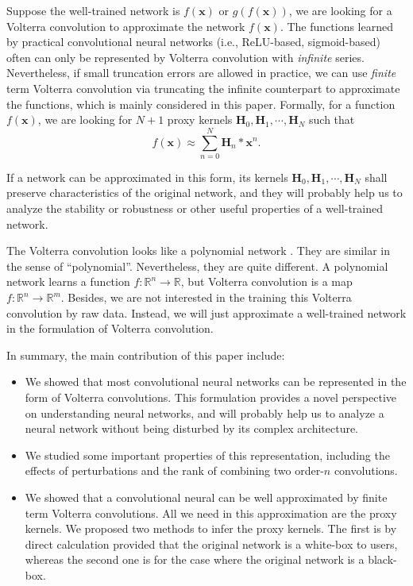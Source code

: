 \documentclass[twoside,11pt]{article}
\def\tvar#1{\mathbf{#1}} %
\begin{document}
Suppose the well-trained network is \(f(\tvar{x})\) or \(g(f(\tvar{x}))\), we are looking for a Volterra convolution to approximate the network \(f(\tvar{x})\).
The functions learned by practical convolutional neural networks (i.e., ReLU-based, sigmoid-based) often can only be represented by Volterra convolution with \textit{infinite} series. 
Nevertheless, if small truncation errors are allowed in practice, we can use \textit{finite} term Volterra convolution via truncating the infinite counterpart to approximate the functions,
which is mainly considered in this paper. Formally, for a function $f(\tvar{x})$, we are looking for $N+1$ proxy kernels \(\tvar{H}_0, \tvar{H}_1, \cdots, \tvar{H}_N\) such that
\begin{equation}
  f(\tvar{x}) \approx \sum_{n=0}^{N} \tvar{H}_n * \tvar{x}^n.
\end{equation}


If a network can be approximated in this form, its kernels \(\tvar{H}_0, \tvar{H}_1, \cdots, \tvar{H}_N\) shall preserve characteristics of the original network, and they will probably help us to analyze the stability or robustness or other useful properties of a well-trained network.

The Volterra convolution looks like a polynomial network \citep{Giles1987,Shin1995,Shin2003, Fallahnezhad2011}. They are similar in the sense of ``polynomial''. Nevertheless, they are quite different. A polynomial network learns a function \(f: \mathbb{R}^n \rightarrow \mathbb{R}\), but Volterra convolution is a map \(f : \mathbb{R}^{n} \rightarrow \mathbb{R}^{m}\). Besides, we are not interested in the training this Volterra convolution by raw data. Instead, we will just approximate a well-trained network in the formulation of Volterra convolution.


In summary, the main contribution of this paper include:
\begin{itemize}
  \item We showed that most convolutional neural networks can be represented in the form of Volterra convolutions. This formulation provides a novel perspective on understanding neural networks, and will probably help us to analyze a neural network without being disturbed by its complex architecture.
  \item We studied some important properties of this representation, including the effects of perturbations and the rank of combining two order-\(n\) convolutions.
  \item We showed that a convolutional neural can be well approximated by  finite term Volterra convolutions. All we need in this approximation are the proxy kernels. We proposed two methods to infer the proxy kernels. The first is by direct calculation provided that the original network is a white-box to users, whereas the second one is for the case where the original network is a black-box.
\end{itemize}
\end{document}
